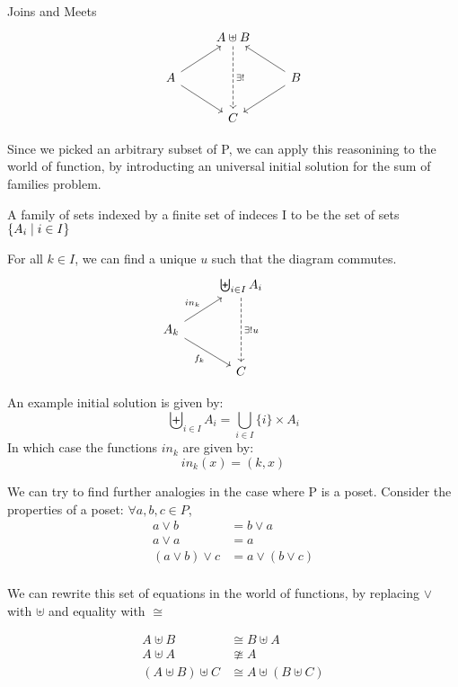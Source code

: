\begin{section}{Joins and Meets}
\begin{align*}
    \begin{tikzcd}[ampersand replacement=\&]
        {} \& A \uplus B \arrow[dd, dashed, "\exists ! "] \& {} \\
        A \arrow[ru] \arrow[rd, swap]
        \& {}
        \&
        B \arrow[lu, swap] \arrow[ld]
        \\
        {} \& C \& {}
    \end{tikzcd}
\end{align*}

Since we picked an arbitrary subset of P, we can apply this reasonining to
the world of function, by introducting an universal initial solution for 
the sum of families problem.

\begin{definition} A family of sets indexed by a finite set of indeces I   
to be the set of sets $\{ A_i \mid i \in I \}$
\end{definition}
For all $k \in I$, we can find a unique $u$ such that the diagram commutes.
\begin{align*}
    \begin{tikzcd}[ampersand replacement=\&]
        {} \& \biguplus_{i \in I} A_i \arrow[dd, dashed, "\exists ! u"] \& {} \\
        A_k \arrow[ru, "in_k"] \arrow[rd, swap, "f_k"]
        \& {}
        \\
        {} \& C \& {}
    \end{tikzcd}
\end{align*}

An example initial solution is given by:
\[ \biguplus_{i \in I} A_i = \bigcup_{i \in I} \{i\} \times A_i \]
In which case the functions $in_k$ are given by:
\[ in_k(x) = (k, x)\]

We can try to find further analogies in the case where P is a poset. Consider
the properties of a poset: $\forall a, b, c \in P$,
\begin{align*}
    a \vee b &= b \vee a \\
    a \vee a &= a \\
    (a \vee b) \vee c &= a \vee (b \vee c) \\
\end{align*}

We can rewrite this set of equations in the world of functions, by replacing 
$\vee$ with $\uplus$ and equality with $\cong$

\begin{align*}
    A \uplus B &\cong B \uplus A  \\
    A \uplus A &\ncong A \\ 
    (A \uplus B) \uplus C &\cong A \uplus (B \uplus C) \\ 
\end{align*}


\end{section}
